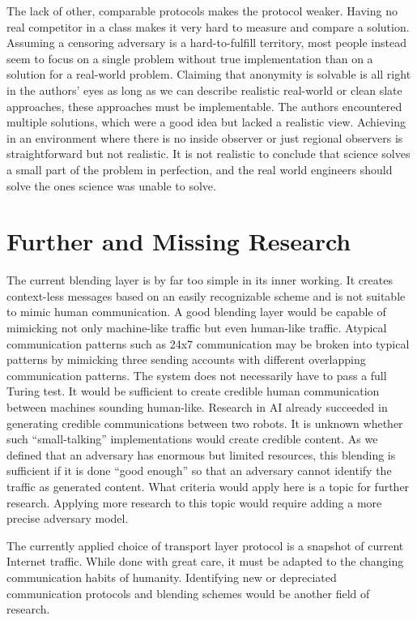 The lack of other, comparable protocols makes the \MessageVortex{} protocol weaker. Having no real competitor in a class makes it very hard to measure and compare a solution. Assuming a censoring adversary is a hard-to-fulfill territory, most people instead seem to focus on a single problem without true implementation than on a solution for a real-world problem. Claiming that anonymity is solvable is all right in the authors' eyes as long as we can describe realistic real-world or clean slate approaches, these approaches must be implementable. The authors encountered multiple solutions, which were a good idea but lacked a realistic view. Achieving in an environment where there is no inside observer or just regional observers is straightforward but not realistic. It is not realistic to conclude that science solves a small part of the problem in perfection, and the real world engineers should solve the ones science was unable to solve.

\section{Further and Missing Research}
The current blending layer is by far too simple in its inner working. It creates context-less messages based on an easily recognizable scheme and is not suitable to mimic human communication. A good blending layer would be capable of mimicking not only machine-like traffic but even human-like traffic. Atypical communication patterns such as 24x7 communication may be broken into typical patterns by mimicking three sending accounts with different overlapping communication patterns. The system does not necessarily have to pass a full Turing test. It would be sufficient to create credible human communication between machines sounding human-like. Research in AI already succeeded in generating credible communications between two robots. It is unknown whether such ``small-talking'' implementations would create credible content. As we defined that an adversary has enormous but limited resources, this blending is sufficient if it is done ``good enough'' so that an adversary cannot identify the traffic as generated content. What criteria would apply here is a topic for further research. Applying more research to this topic would require adding a more precise adversary model.

The currently applied choice of transport layer protocol is a snapshot of current Internet traffic. While done with great care, it must be adapted to the changing communication habits of humanity. Identifying new or depreciated communication protocols and blending schemes would be another field of research.

